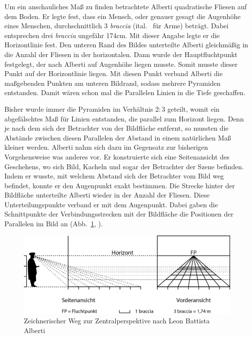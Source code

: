 \documentclass[12pt,a4paper]{article}
\begin{document}
Um ein anschauliches Maß zu finden betrachtete Alberti quadratische Fliesen auf dem Boden. Er legte fest, dass ein Mensch, oder genauer gesagt die Augenhöhe eines Menschen, durchschnittlich 3 \textit{braccia} (ital.~ für \glqq Arme\grqq) beträgt. Dabei entsprechen drei \textit{braccia} ungefähr 174cm. Mit dieser Angabe legte er die Horizontlinie fest. Den unteren Rand des Bildes unterteilte Alberti gleichmäßig in die Anzahl der Fliesen in der horizontalen. Dann wurde der Hauptfluchtpunkt festgelegt, der nach Alberti auf Augenhöhe liegen musste. Somit musste dieser Punkt auf der Horizontlinie liegen. Mit diesen Punkt verband Alberti die maßgebenden Punkten am unteren Bildrand, sodass mehrere Pyramiden entstanden. Damit wären schon mal die Parallelen Linien in die Tiefe geschaffen.

Bisher wurde immer die Pyramiden im Verhältnis $2 : 3$ geteilt, womit ein abgefälschtes Maß für Linien entstanden, die parallel zum Horizont liegen. Denn je nach dem sich der Betrachter von der Bildfläche entfernt, so mussten die Abstände zwischen diesen Parallelen der Abstand in einem natürlichen Maß kleiner werden. Alberti nahm sich dazu im Gegensatz zur bisherigen Vorgehensweise was anderes vor. Er konstruierte sich eine Seitenansicht des Geschehens, wo sich Bild, Kacheln und sogar der Betrachter der Szene befinden. Indem er wusste, mit welchem Abstand sich der Betrachter vom Bild weg befindet, konnte er den Augenpunkt exakt bestimmen. Die Strecke hinter der Bildfläche unterteilte Alberti wieder in der Anzahl der Fliesen. Diese Unterteilungspunkte verband er mit dem Augenpunkt. Dabei gaben die Schnittpunkte der Verbindungsstrecken mit der Bildfläche die Positionen der Parallelen im Bild an (Abb.~\ref{fig:braccia}, \citep[vgl.][S.~31ff]{perspektive}).

\begin{figure}[htbp] 
\centering
\includegraphics[width=\textwidth]{Bilder/braccia.png}
\caption{Zeichnerischer Weg zur Zentralperspektive nach Leon Battista Alberti}
\label{fig:braccia}
\end{figure}
\end{document}
